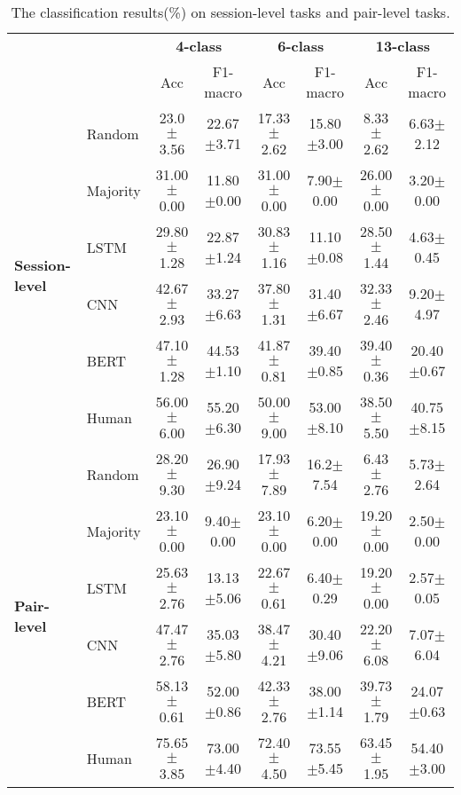 \documentclass[letterpaper]{article} \usepackage{aaai21}  \usepackage{times}  \usepackage{helvet} \usepackage{courier}  \usepackage[hyphens]{url}  \usepackage{graphicx} \usepackage{xcolor}
\begin{document}
\begin{table*}[th]
	\centering
	\small
	\begin{tabular}{@{}llcccccc@{}}
		\toprule[1.5pt]
		&               				& \multicolumn{2}{c}{\textbf{4-class}} & \multicolumn{2}{c}{\textbf{6-class}} & \multicolumn{2}{c}{\textbf{13-class}} \\ 
		& & Acc & F1-macro                 & Acc & F1-macro                  & Acc & F1-macro \\
		\midrule
		\multirow{6}{*}{\textbf{Session-level}}&Random   &23.0$\pm$3.56 &22.67$\pm$3.71 &17.33$\pm$2.62 & 15.80$\pm$3.00& 8.33$\pm$2.62& 6.63$\pm$2.12  \\		
		&Majority    &31.00$\pm$0.00 &11.80$\pm$0.00 &31.00$\pm$0.00 &7.90$\pm$0.00 &26.00$\pm$0.00 &3.20$\pm$0.00 \\
		&LSTM    &29.80$\pm$1.28 &22.87$\pm$1.24 &30.83$\pm$1.16 &11.10$\pm$0.08 &28.50$\pm$1.44 &4.63$\pm$0.45 \\
		&CNN    &42.67$\pm$2.93 & 33.27$\pm$6.63&37.80$\pm$1.31 & 31.40$\pm$6.67 &32.33$\pm$2.46 &9.20$\pm$4.97 \\
&BERT   &47.10$\pm$1.28 &44.53$\pm$1.10 &41.87$\pm$0.81 &39.40$\pm$0.85 &39.40$\pm$0.36 &20.40$\pm$0.67 \\
		&Human &56.00$\pm$6.00 &55.20$\pm$6.30&50.00$\pm$9.00&53.00$\pm$8.10&38.50$\pm$5.50&40.75$\pm$8.15 \\ 
		\midrule
		\multirow{6}{*}{\textbf{Pair-level}}&Random   &28.20$\pm$9.30 &26.90$\pm$9.24 &17.93$\pm$7.89 &16.2$\pm$7.54 &6.43$\pm$2.76 & 5.73$\pm$2.64 \\		
		&Majority    &23.10$\pm$0.00 &9.40$\pm$0.00 &23.10$\pm$0.00 &6.20$\pm$0.00 &19.20$\pm$0.00 & 2.50$\pm$0.00\\
		&LSTM    &25.63$\pm$2.76 &13.13$\pm$5.06 &22.67$\pm$0.61 &6.40$\pm$0.29 &19.20$\pm$0.00 &2.57$\pm$0.05 \\	
		&CNN    &47.47$\pm$2.76 &35.03$\pm$5.80 &38.47$\pm$4.21 &30.40$\pm$9.06 & 22.20$\pm$6.08& 7.07$\pm$6.04\\	
&BERT   &58.13$\pm$0.61 &52.00$\pm$0.86 & 42.33$\pm$2.76&38.00$\pm$1.14 &39.73$\pm$1.79 &24.07$\pm$0.63 \\
		&Human & 75.65$\pm$3.85 &73.00$\pm$4.40 & 72.40$\pm$4.50&73.55$\pm$5.45 &63.45$\pm$1.95 &54.40$\pm$3.00 \\ 
		\bottomrule[1.5pt]
		
	\end{tabular}
	\caption{The classification results(\%) on session-level tasks and pair-level tasks.}
	\label{tab:results}
\end{table*}
\end{document}

